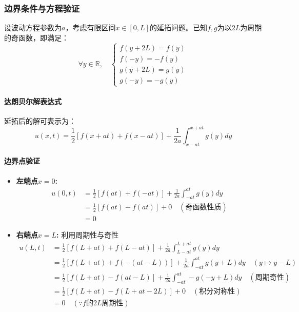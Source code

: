 \documentclass[12pt,a4paper]{article}
\numberwithin{subsection}{section}   %
\numberwithin{subsubsection}{subsection}
\theoremstyle{plain}
\theoremstyle{definition}
\theoremstyle{remark}
\theoremstyle{remark}
\begin{document}
\subsubsection{边界条件与方程验证}
设波动方程参数为$a$，考虑有限区间$x \in [0, L]$的延拓问题。已知$f,g$为以$2L$为周期的奇函数，即满足：
\begin{equation}
	\forall y \in \mathbb{R},\quad 
	\begin{cases}
		f(y + 2L) = f(y) \\
		f(-y) = -f(y) \\
		g(y + 2L) = g(y) \\
		g(-y) = -g(y)
	\end{cases}
\end{equation}

\paragraph{达朗贝尔解表达式}
延拓后的解可表示为：
\begin{equation}
	u(x,t) = \frac{1}{2}[f(x + at) + f(x - at)] + \frac{1}{2a}\int_{x-at}^{x+at} g(y) dy
\end{equation}

\paragraph{边界点验证}
\begin{itemize}
	\item \textbf{左端点$x=0$:}
	\begin{align*}
		u(0,t) &= \frac{1}{2}[f(at) + f(-at)] + \frac{1}{2a}\int_{-at}^{at} g(y) dy \\
		&= \frac{1}{2}[f(at) - f(at)] + 0 \quad (\text{奇函数性质}) \\
		&= 0
	\end{align*}
	
	\item \textbf{右端点$x=L$:} 利用周期性与奇性
	\begin{align*}
		u(L,t) &= \frac{1}{2}[f(L+at) + f(L-at)] + \frac{1}{2a}\int_{L-at}^{L+at} g(y) dy \\
		&= \frac{1}{2}[f(L+at) + f(-(at-L))] + \frac{1}{2a}\int_{-at}^{at} g(y+L) dy \quad (y \mapsto y-L) \\
		&= \frac{1}{2}[f(L+at) - f(at-L)] + \frac{1}{2a}\int_{-at}^{at} -g(-y+L) dy \quad (\text{周期奇性}) \\
		&= \frac{1}{2}[f(L+at) - f(L+at-2L)] + 0 \quad (\text{积分对称性}) \\
		&= 0 \quad (\because f\text{的}2L\text{周期性})
	\end{align*}
\end{itemize}
\end{document}
